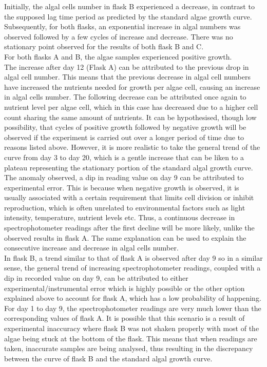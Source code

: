 \documentclass[12pt,a4paper]{IEEEtran}
\begin{document}
    Initially, the algal cells number in flask B experienced a decrease, in contrast to the supposed lag time period as predicted by the standard algae growth curve. Subsequently, for both flasks, an exponential
    increase in algal numbers was observed followed by a few cycles of increase and decrease. There was no stationary point observed for the results of both flask B and C. \\
    
    For both flasks A and B, the algae samples experienced positive growth. \\
    
    The increase after day 12 (Flask A) can be attributed to the previous drop in algal cell number. This means that the previous decrease in algal cell numbers have increased the nutrients needed for growth per
    algae cell, causing an increase in algal cells number. The following decrease can be attributed once again to nutrient level per algae cell, which in this case has decreased due to a higher cell count sharing the same amount of nutrients. It can be hypothesised, though low possibility, that cycles of positive growth followed by negative growth will be observed if the experiment is carried out over a longer period of time due to reasons listed above. However, it is more realistic to take the general trend of the curve from day 3 to day 20, which is a gentle increase that can be liken to a plateau representing the stationary portion of the standard algal growth curve. The anomaly observed, a dip in reading value on day 9 can be attributed to experimental error. This is because when negative growth is observed, it is usually associated with a certain requirement that limits cell division or inhibit reproduction, which is often unrelated to environmental factors such as light intensity, temperature, nutrient levels etc. Thus, a continuous decrease in spectrophotometer readings after the first decline will be more likely, unlike the observed results in flask A. The same explanation can be used to explain the consecutive increase and decrease in algal cells number. \\ 
    
    In flask B, a trend similar to that of flask A is observed after day 9 so in a similar sense, the general trend of increasing spectrophotometer readings, coupled with a dip in recorded value on day 9, can be attributed to either experimental/instrumental error which is highly possible or the other option explained above to account for flask A, which has a low probability of happening. For day 1 to day 9, the spectrophotometer readings are very much lower than the corresponding values of flask A. It is possible that this scenario is a result of experimental inaccuracy where flask B was not shaken properly with most of the algae being stuck at the bottom of the flask. This means that when readings are taken, inaccurate samples are being analysed, thus resulting in the discrepancy between the curve of flask B and the standard algal growth curve.
    
\end{document}
